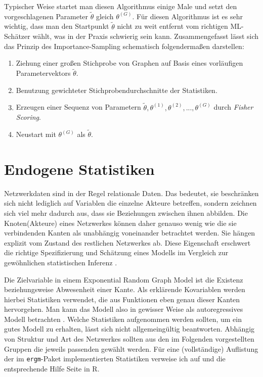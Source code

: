 \documentclass[a4paper,ngerman,oneside,titlepage,bibliography=totoc,11pt]{scrreprt}
\begin{document}
Typischer Weise startet man diesen Algorithmus einige Male und setzt den vorgeschlagenen Parameter $\widetilde{\theta}$ gleich $\theta^{(G)}$. Für diesen Algorithmus ist es sehr wichtig, dass man den Startpunkt $\widetilde{\theta}$ nicht zu weit entfernt vom richtigen ML-Schätzer wählt, was in der Praxis schwierig sein kann. Zusammengefasst lässt sich das Prinzip des Importance-Sampling schematisch folgendermaßen darstellen:

	\begin{enumerate}
		\item Ziehung einer großen Stichprobe von Graphen auf Basis eines vorläufigen Parametervektors $\tilde{\theta}$.
		\item Benutzung gewichteter Stichprobendurchschnitte der Statistiken.
		\item Erzeugen einer Sequenz von Parametern $\widetilde{\theta},\theta^{(1)}, \theta^{(2)},...,\theta^{(G)}$ durch \emph{Fisher Scoring}.
		\item Neustart mit $\theta^{(G)}$ als $\tilde{\theta}$.
	\end{enumerate}


\section{Endogene Statistiken}
Netzwerkdaten sind in der Regel relationale Daten. Das bedeutet, sie beschränken sich nicht lediglich auf Variablen die einzelne Akteure betreffen, sondern zeichnen sich viel mehr dadurch aus, dass sie Beziehungen zwischen ihnen abbilden. Die Knoten(Akteure) eines Netzwerkes können daher genauso wenig wie die sie verbindenden Kanten als unabhängig voneinander betrachtet werden. Sie hängen explizit vom Zustand des restlichen Netzwerkes ab. Diese Eigenschaft erschwert die richtige Spezifizierung und Schätzung eines Modells im Vergleich zur gewöhnlichen statistischen Inferenz \citep{handcock2008statnet}. 

Die Zielvariable in einem Exponential Random Graph Model ist die Existenz beziehungsweise Abwesenheit einer Kante. Als erklärende Kovariablen werden hierbei Statistiken verwendet, die aus Funktionen eben genau dieser Kanten hervorgehen. Man kann das Modell also in gewisser Weise als autoregressives Modell betrachten \citep{morris2008specification}. Welche Statistiken aufgenommen werden sollten, um ein gutes Modell zu erhalten, lässt sich nicht allgemeingültig beantworten. Abhängig von Struktur und Art des Netzwerkes sollten aus den im Folgenden vorgestellten Gruppen die jeweils passenden gewählt werden. Für eine (vollständige) Auflistung der im \texttt{ergm}-Paket \citep{pack:ergm} implementierten Statistiken verweise ich auf \citep{morris2008specification} und die entsprechende Hilfe Seite in R.
\end{document}
